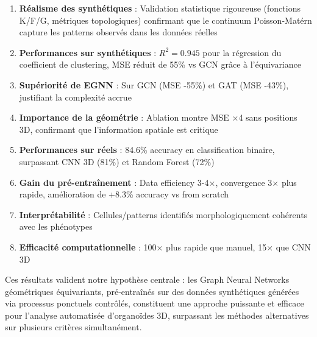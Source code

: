 \begin{enumerate}
    \item \textbf{Réalisme des synthétiques} : Validation statistique rigoureuse (fonctions K/F/G, métriques topologiques) confirmant que le continuum Poisson-Matérn capture les patterns observés dans les données réelles
    
    \item \textbf{Performances sur synthétiques} : $R^2 = 0.945$ pour la régression du coefficient de clustering, MSE réduit de 55\% vs GCN grâce à l'équivariance
    
    \item \textbf{Supériorité de EGNN} : Sur GCN (MSE -55\%) et GAT (MSE -43\%), justifiant la complexité accrue
    
    \item \textbf{Importance de la géométrie} : Ablation montre MSE ×4 sans positions 3D, confirmant que l'information spatiale est critique
    
    \item \textbf{Performances sur réels} : 84.6\% accuracy en classification binaire, surpassant CNN 3D (81\%) et Random Forest (72\%)
    
    \item \textbf{Gain du pré-entraînement} : Data efficiency 3-4×, convergence 3× plus rapide, amélioration de +8.3\% accuracy vs from scratch
    
    \item \textbf{Interprétabilité} : Cellules/patterns identifiés morphologiquement cohérents avec les phénotypes
    
    \item \textbf{Efficacité computationnelle} : 100× plus rapide que manuel, 15× que CNN 3D
\end{enumerate}

Ces résultats valident notre hypothèse centrale : les Graph Neural Networks géométriques équivariants, pré-entraînés sur des données synthétiques générées via processus ponctuels contrôlés, constituent une approche puissante et efficace pour l'analyse automatisée d'organoïdes 3D, surpassant les méthodes alternatives sur plusieurs critères simultanément.

